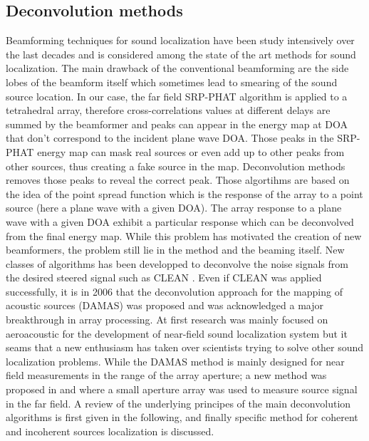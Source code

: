 \subsection{Deconvolution methods}

Beamforming techniques for sound localization have been study intensively over the last decades and is considered among the state of the art methods for sound localization. The main drawback of the conventional beamforming are the side lobes of the beamform itself which sometimes lead to smearing of the sound source location. In our case, the far field SRP-PHAT algorithm is applied to a tetrahedral array, therefore cross-correlations values at different delays are summed by the beamformer and peaks can appear in the energy map at DOA that don't correspond to the incident plane wave DOA. Those peaks in the SRP-PHAT energy map can mask real sources or even add up to other peaks from other sources, thus creating a fake source in the map. Deconvolution methods removes those peaks to reveal the correct peak. Those algortihms are based on the idea of the point spread function which is the response of the array to a point source (here a plane wave with a given DOA). The array response to a plane wave with a given DOA exhibit a particular response which can be deconvolved from the final energy map. While this problem has motivated the creation of new beamformers, the problem still lie in the method and the beaming itself. New classes of algorithms has been developped to deconvolve the noise signals from the desired steered signal such as CLEAN \cite{sijtsma2007clean}. Even if CLEAN was applied successfully, it is in 2006 that the deconvolution approach for the mapping of acoustic sources (DAMAS) was proposed \cite{brooks2006deconvolution} and was acknowledged a major breakthrough in array processing. At first research was mainly focused on aeroacoustic for the development of near-field sound localization system but it seams that a new enthusiasm has taken over scientists trying to solve other sound localization problems. While the DAMAS method is mainly designed for near field measurements in the range of the array aperture; a new method was proposed in \cite{zhao2015large} and \cite{zhao2017large} where a small aperture array was used to measure source signal in the far field. A review of the underlying principes of the main deconvolution algorithms is first given in the following, and finally specific method for coherent and incoherent sources localization is discussed.





